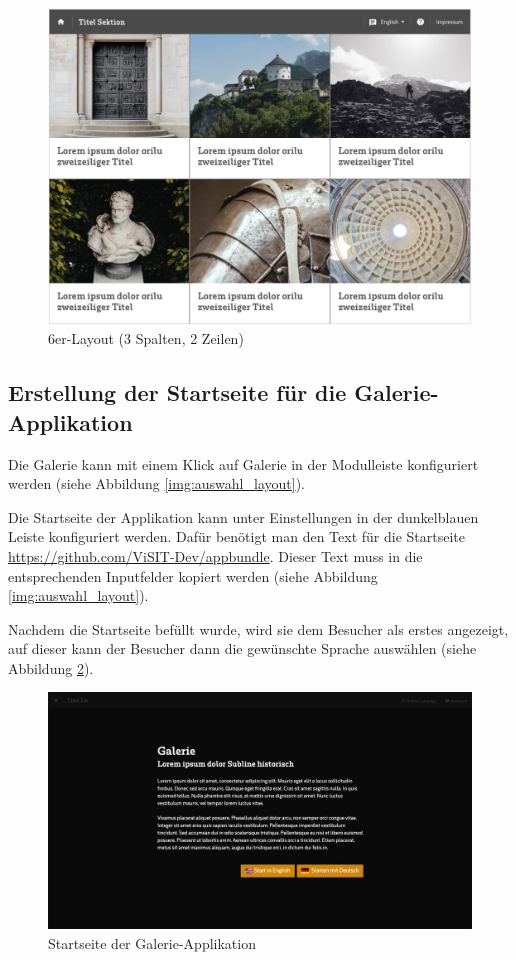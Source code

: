 \begin{figure}[ht!]
\centering
\includegraphics[width=12cm]{Figures/paula/galerie/layout_6er.png}
\caption{6er-Layout (3 Spalten, 2 Zeilen)}
\label{img:layout_6er}
\end{figure}


\subsection{Erstellung der Startseite für die Galerie-Applikation}

Die Galerie kann mit einem Klick auf \glqq Galerie\grqq{} in der Modulleiste konfiguriert werden (siehe Abbildung \ref{img:auswahl_layout}).


Die Startseite der Applikation kann unter \glqq Einstellungen\grqq{} in der dunkelblauen Leiste konfiguriert werden. Dafür benötigt man den Text für die Startseite \url{https://github.com/ViSIT-Dev/appbundle}. Dieser Text muss in die entsprechenden Inputfelder kopiert werden (siehe Abbildung \ref{img:auswahl_layout}).


Nachdem die Startseite befüllt wurde, wird sie dem Besucher als erstes angezeigt, auf dieser kann der Besucher dann die gewünschte Sprache auswählen (siehe Abbildung \ref{img:startseite}).

\begin{figure}[ht!]
\centering
\includegraphics[width=12cm]{Figures/paula/galerie/startseite.png}
\caption{Startseite der Galerie-Applikation}
\label{img:startseite}
\end{figure}



